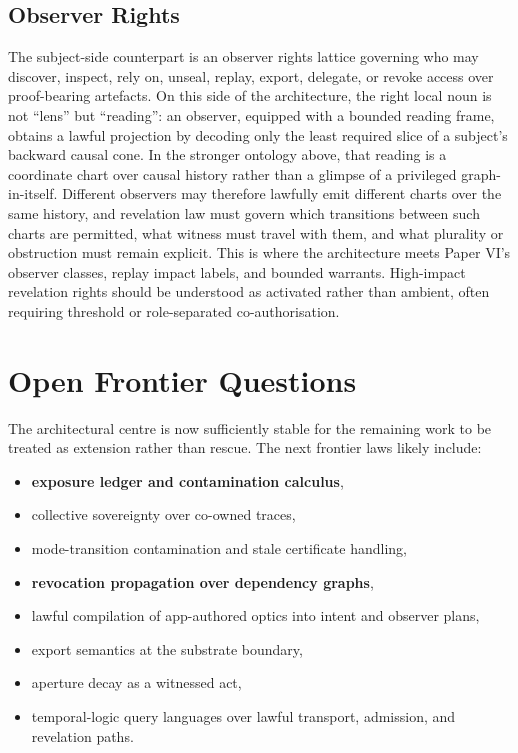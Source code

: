 \documentclass[11pt]{article}
\theoremstyle{definition}
\theoremstyle{plain}
\theoremstyle{remark}
\begin{document}
\subsection{Observer Rights}

The subject-side counterpart is an observer rights lattice governing who may discover, inspect, rely on, unseal, replay, export, delegate, or revoke access over proof-bearing artefacts. On this side of the architecture, the right local noun is not ``lens'' but ``reading'': an observer, equipped with a bounded reading frame, obtains a lawful projection by decoding only the least required slice of a subject's backward causal cone. In the stronger ontology above, that reading is a coordinate chart over causal history rather than a glimpse of a privileged graph-in-itself. Different observers may therefore lawfully emit different charts over the same history, and revelation law must govern which transitions between such charts are permitted, what witness must travel with them, and what plurality or obstruction must remain explicit. This is where the architecture meets Paper VI's observer classes, replay impact labels, and bounded warrants. High-impact revelation rights should be understood as activated rather than ambient, often requiring threshold or role-separated co-authorisation.

\section{Open Frontier Questions}

The architectural centre is now sufficiently stable for the remaining work to be treated as extension rather than rescue. The next frontier laws likely include:

\begin{itemize}[leftmargin=*]
  \item \textbf{exposure ledger and contamination calculus},
  \item collective sovereignty over co-owned traces,
  \item mode-transition contamination and stale certificate handling,
  \item \textbf{revocation propagation over dependency graphs},
  \item lawful compilation of app-authored optics into intent and observer plans,
  \item export semantics at the substrate boundary,
  \item aperture decay as a witnessed act,
  \item temporal-logic query languages over lawful transport, admission, and revelation paths.
\end{itemize}
\end{document}
